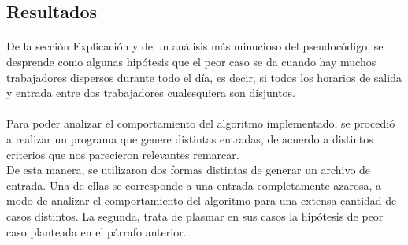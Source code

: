 \subsection{Resultados}
\label{resultadosej3}

\paragraph{}
De la sección Explicación y de un análisis más minucioso del pseudocódigo, se desprende como algunas hipótesis
 que el peor caso se da cuando hay muchos trabajadores dispersos durante todo el día, es decir, si todos los horarios de salida y entrada entre dos trabajadores cualesquiera son disjuntos.

\paragraph{}
Para poder analizar el comportamiento del algoritmo implementado, se procedió a realizar un programa que genere distintas entradas, de acuerdo a distintos criterios que nos parecieron relevantes remarcar.\\
De esta manera, se utilizaron dos formas distintas de generar un archivo de entrada. Una de ellas se corresponde a una entrada completamente azarosa, a modo de analizar el comportamiento del algoritmo para una extensa cantidad de casos distintos. La segunda, trata de plasmar en sus casos la hipótesis de peor caso planteada en el párrafo anterior.

